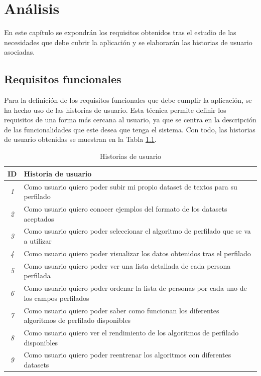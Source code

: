 \chapter{Análisis}
\label{chap:analisis}

En este capítulo se expondrán los requisitos obtenidos tras el estudio de las necesidades que debe cubrir la aplicación
y se elaborarán las historias de usuario asociadas.

\section{Requisitos funcionales}
\label{sec:analisis_requisitos_funcionales}

Para la definición de los requisitos funcionales que debe cumplir la aplicación, se ha hecho uso de las historias de usuario.
Esta técnica permite definir los requisitos de una forma más cercana al usuario, ya que se centra en la descripción
de las funcionalidades que este desea que tenga el sistema. Con todo, las historias de usuario obtenidas se muestran en la
Tabla \ref{tab:historias_usuario}.

\bigskip
\begin{table}[H]
  \centering
  \begin{tabular}{c|p{11cm}}
		\rowcolor{udcpink!25}
		\textbf{ID} & \textbf{Historia de usuario} \\\hline
		\small \textit{1} & \small Como usuario quiero poder subir mi propio dataset de textos para su perfilado \\
		\small \textit{2} & \small Como usuario quiero conocer ejemplos del formato de los datasets aceptados \\
		\small \textit{3} & \small Como usuario quiero poder seleccionar el algoritmo de perfilado que se va a utilizar \\
		\small \textit{4} & \small Como usuario quiero poder visualizar los datos obtenidos tras el perfilado \\
		\small \textit{5} & \small Como usuario quiero poder ver una lista detallada de cada persona perfilada \\
		\small \textit{6} & \small Como usuario quiero poder ordenar la lista de personas por cada uno de los campos perfilados \\
		\small \textit{7} & \small Como usuario quiero poder saber como funcionan los diferentes algoritmos de perfilado disponibles \\
		\small \textit{8} & \small Como usuario quiero ver el rendimiento de los algoritmos de perfilado disponibles \\
		\small \textit{9} & \small Como usuario quiero poder reentrenar los algoritmos con diferentes datasets \\
  \end{tabular}
  \caption{Historias de usuario}
  \label{tab:historias_usuario}
\end{table}

